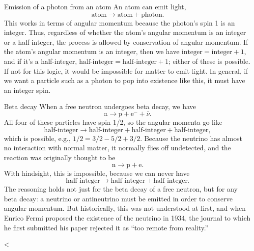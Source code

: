 \begin{eg}{Emission of a photon from an atom}
An atom can emit light,
\begin{equation*}
  \text{atom} \rightarrow \text{atom}+\text{photon}.
\end{equation*}
This works in terms of angular momentum because the photon's spin 1 is an integer.
Thus, regardless of whether the atom's angular momentum is an integer or a half-integer,
the process is allowed by conservation of angular momentum. If the atom's angular momentum
is an integer, then we have $\text{integer}=\text{integer}+1$, and if it's
a half-integer, $\text{half-integer}=\text{half-integer}+1$; either of these is possible.
If not for this logic, it would be impossible for matter to emit light. In general,
if we want a particle such as a photon to pop into existence like this, it must
have an integer spin.
\end{eg}

\begin{eg}{Beta decay}
When a free neutron undergoes beta decay, we have
\begin{equation*}
  \text{n} \rightarrow \text{p}+\text{e}^-+\bar{\nu}.
\end{equation*}
All four of these particles have spin 1/2, so the angular momenta go like
\begin{equation*}
  \text{half-integer} \rightarrow \text{half-integer}+\text{half-integer}+\text{half-integer},
\end{equation*}
which is possible, e.g., $1/2=3/2-5/2+3/2$. Because the neutrino has almost no interaction with
normal matter, it normally flies off undetected, and the reaction was originally thought to be
\begin{equation*}
  \text{n} \rightarrow \text{p}+\text{e}.
\end{equation*}
With hindsight, this is impossible, because we can never have
\begin{equation*}
  \text{half-integer} \rightarrow \text{half-integer}+\text{half-integer}.
\end{equation*}
The reasoning holds not just for the beta decay of a free neutron, but for any beta decay: a neutrino or antineutrino
must be emitted in order to conserve angular momentum.
But historically, this was not understood at first, and when Enrico Fermi proposed the
existence of the neutrino in 1934, the journal to which he first submitted his paper
rejected it as ``too remote from reality.''
\end{eg}

<%
